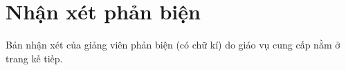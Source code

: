 \chapter*{Nhận xét phản biện}
\label{thanks}

Bản nhận xét của giảng viên phản biện (có chữ kí) do giáo vụ cung cấp nằm ở trang kế tiếp.
